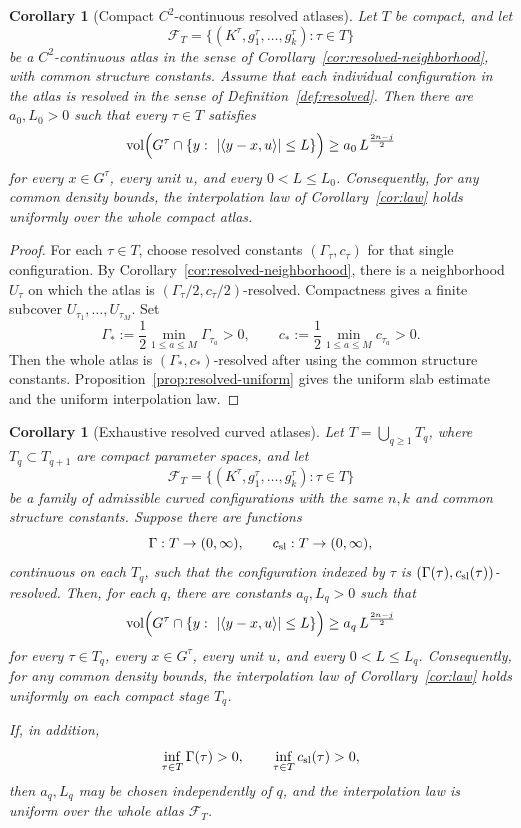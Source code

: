\documentclass[11pt]{article}
\newtheorem{corollary}[theorem]{Corollary}
\newcommand{\vol}{\operatorname{vol}}
\begin{document}
\begin{corollary}[Compact \(C^2\)-continuous resolved atlases]
\label{cor:c2-compact-atlas}
Let \(T\) be compact, and let
\[
  \mathcal F_T=\{(K^\tau,g^\tau_1,\ldots,g^\tau_k):\tau\in T\}
\]
be a \(C^2\)-continuous atlas in the sense of
Corollary~\ref{cor:resolved-neighborhood}, with common structure constants.
Assume that each individual configuration in the atlas is resolved in the
sense of Definition~\ref{def:resolved}.  Then there are \(a_0,L_0>0\) such
that every \(\tau\in T\) satisfies
\[
\vol\Bigl(G^\tau\cap\{y:\ |\langle y-x,u\rangle|\le L\}\Bigr)
\ge a_0\,L^{\frac{2n-j}2}
\]
for every \(x\in G^\tau\), every unit \(u\), and every \(0<L\le L_0\).
Consequently, for any common density bounds, the interpolation law of
Corollary~\ref{cor:law} holds uniformly over the whole compact atlas.
\end{corollary}

\begin{proof}
For each \(\tau\in T\), choose resolved constants
\((\Gamma_\tau,c_\tau)\) for that single configuration.  By
Corollary~\ref{cor:resolved-neighborhood}, there is a neighborhood
\(U_\tau\) on which the atlas is
\((\Gamma_\tau/2,c_\tau/2)\)-resolved.  Compactness gives a finite subcover
\(U_{\tau_1},\ldots,U_{\tau_M}\).  Set
\[
  \Gamma_*:=\frac12\min_{1\le a\le M}\Gamma_{\tau_a}>0,\qquad
  c_*:=\frac12\min_{1\le a\le M}c_{\tau_a}>0 .
\]
Then the whole atlas is \((\Gamma_*,c_*)\)-resolved after using the common
structure constants.  Proposition~\ref{prop:resolved-uniform} gives the
uniform slab estimate and the uniform interpolation law.
\end{proof}

\begin{corollary}[Exhaustive resolved curved atlases]
\label{cor:exhaustive-atlas}
Let \(T=\bigcup_{q\ge1}T_q\), where \(T_q\subset T_{q+1}\) are compact
parameter spaces, and let
\[
  \mathcal F_T=\{(K^\tau,g^\tau_1,\ldots,g^\tau_k):\tau\in T\}
\]
be a family of admissible curved configurations with the same \(n,k\) and common
structure constants.  Suppose there are functions
\[
  \Gamma:T\to(0,\infty),\qquad c_{\rm sl}:T\to(0,\infty),
\]
continuous on each \(T_q\), such that the configuration indexed by \(\tau\) is
\((\Gamma(\tau),c_{\rm sl}(\tau))\)-resolved.  Then, for each \(q\), there are
constants \(a_q,L_q>0\) such that
\[
\vol\Bigl(G^\tau\cap\{y:\ |\langle y-x,u\rangle|\le L\}\Bigr)
\ge a_q\,L^{\frac{2n-j}2}
\]
for every \(\tau\in T_q\), every \(x\in G^\tau\), every unit \(u\), and every
\(0<L\le L_q\).  Consequently, for any common density bounds, the interpolation
law of Corollary~\ref{cor:law} holds uniformly on each compact stage \(T_q\).

If, in addition,
\[
  \inf_{\tau\in T}\Gamma(\tau)>0,\qquad
  \inf_{\tau\in T}c_{\rm sl}(\tau)>0,
\]
then \(a_q,L_q\) may be chosen independently of \(q\), and the interpolation law
is uniform over the whole atlas \(\mathcal F_T\).
\end{corollary}
\end{document}
